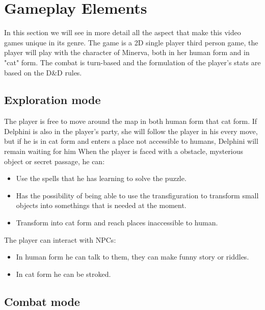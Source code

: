 \section{Gameplay Elements}

In this section we will see in more detail all the aspect that make this video games unique in its genre. The game is a 2D single player third person game, the player will play with the character of Minerva, both in her human form and in "cat" form. The combat is turn-based and the formulation of the player's stats are based on the D\&D rules.

\subsection{Exploration mode}

The player is free to move around  the map in both human form that cat form. If Delphini is also in the player's party, she will follow the player in his every move, but if he is in cat form and enters a place not accessible to humans, Delphini will remain waiting for him When the player is faced with a obstacle, mysterious object or secret passage, he can: 

\begin{itemize}
    \item Use the spells that he has learning to solve the puzzle.
    \item Has the possibility of being able to use the transfiguration to transform small objects into somethings that is needed at the moment.
    \item Transform into cat form and reach places inaccessible to human.
\end{itemize}

The player can interact with NPCs:

\begin{itemize}
    \item In human form he can talk to them, they can make funny story or riddles.
    \item In cat form he can be stroked.
\end{itemize}


\subsection{Combat mode}

